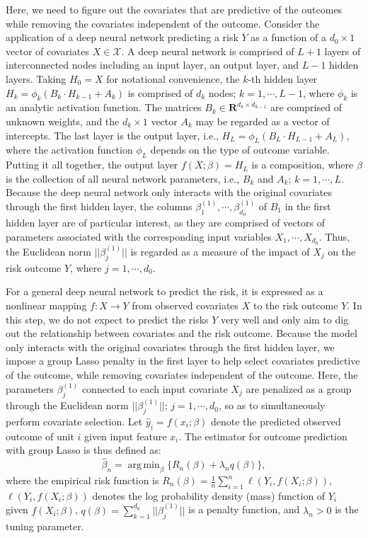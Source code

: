 \documentclass[letterpaper]{article} %
\newcommand{\mb}{\mathbf}
\newcommand{\mc}{\mathcal}
\DeclareMathOperator*{\argmin}{arg\,min}
\theoremstyle{definition}
\theoremstyle{remark}
\begin{document}
Here, we need to figure out the covariates that are predictive of the outcomes while removing the covariates independent of the outcome. Consider the application of a deep neural network predicting a risk $Y$ as a function of a $d_0\times1$ vector of covariates $X \in \mc{X}$. A deep neural network is comprised of $L+1$ layers of interconnected nodes including an input layer, an output layer, and $L-1$ hidden layers. Taking $H_0=X$ for notational convenience, the $k$-th hidden layer $H_{k}=\phi_k(B_k \cdot H_{k-1} + A_k)$ is comprised of $d_k$ nodes; $k=1,\cdots,L-1$, where $\phi_k$ is an analytic activation function. The matrices $B_k \in \mb{R}^{d_{k}\times d_{k-1} }$ are comprised of unknown weights, and the $d_k \times 1$ vector $A_k$ may be regarded as a vector of intercepts. The last layer is the output layer, i.e., $H_L=\phi_L(B_L \cdot H_{L-1} + A_L)$, where the activation function $\phi_L$ depends on the type of outcome variable. Putting it all together, the output layer $f(X;\beta)=H_L$ is a composition, where $\beta$ is the collection of all neural network parameters, i.e., $B_k$ and $A_k$; $k=1,\cdots, L$. Because the deep neural network only interacts with the original covariates through the first hidden layer, the columns $\beta_1^{(1)}, \cdots,\beta_{d_0}^{(1)}$ of $B_1$  in the first hidden layer are of particular interest, as they are comprised of vectors of parameters associated with the corresponding input variables $X_1,\cdots,X_{d_0}$. Thus, the Euclidean norm $||\beta_j^{(1)} ||$ is regarded as a measure of the impact of $X_j$ on the risk outcome $Y$, where $j=1, \cdots , d_0$. 

For a general deep neural network to predict the risk, it is expressed as a nonlinear mapping $f: X \rightarrow Y$ from observed covariates $X$ to the risk outcome $Y$. In this step, we do not expect to predict the risks $Y$ very well and only aim to dig out the relationship between covariates and the risk outcome. Because the model only interacts with the original covariates through the first hidden layer, we impose a group Lasso penalty in the first layer to help select covariates predictive of the outcome, while removing covariates independent of the outcome. Here, the parameters $\beta_j^{(1)}$ connected to each input covariate $X_j$ are penalized as a group through the Euclidean norm $||\beta_j^{(1)}||$; $j=1,\cdots,d_0$, so as to simultaneously perform covariate selection. Let $\hat{y}_i=f(x_i;\beta)$ denote the predicted observed outcome of unit $i$ given input feature $x_i$. The estimator for outcome prediction with group Lasso is thus defined as:
\begin{equation}
    \widehat{\beta}_n = \argmin_{\beta} \{ R_n(\beta)+\lambda_n q(\beta)\},
    \label{Eqn: outcome}
\end{equation}
where the empirical risk function is $R_n(\beta)=\frac{1}{n}\sum_{i=1}^{n}\ell(Y_i,f(X_i;\beta))$, $\ell(Y_i,f(X_i;\beta))$ denotes the log probability density (mass) function of $Y_i$ given $f(X_i;\beta)$, $q(\beta)=\sum_{k=1}^{d_0}||\beta_j^{(1)}||$ is a penalty function, and $\lambda_n > 0$ is the tuning parameter.
\end{document}
